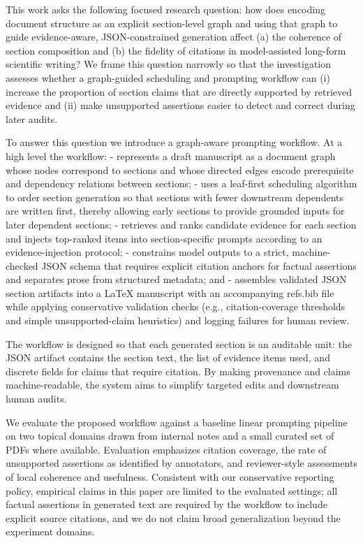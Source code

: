 \documentclass{article}%
\begin{document}
This work asks the following focused research question: how does encoding document structure as an explicit section-level graph and using that graph to guide evidence-aware, JSON-constrained generation affect (a) the coherence of section composition and (b) the fidelity of citations in model-assisted long-form scientific writing? We frame this question narrowly so that the investigation assesses whether a graph-guided scheduling and prompting workflow can (i) increase the proportion of section claims that are directly supported by retrieved evidence and (ii) make unsupported assertions easier to detect and correct during later audits.

To answer this question we introduce a graph-aware prompting workflow. At a high level the workflow: - represents a draft manuscript as a document graph whose nodes correspond to sections and whose directed edges encode prerequisite and dependency relations between sections; - uses a leaf-first scheduling algorithm to order section generation so that sections with fewer downstream dependents are written first, thereby allowing early sections to provide grounded inputs for later dependent sections; - retrieves and ranks candidate evidence for each section and injects top-ranked items into section-specific prompts according to an evidence-injection protocol; - constrains model outputs to a strict, machine-checked JSON schema that requires explicit citation anchors for factual assertions and separates prose from structured metadata; and - assembles validated JSON section artifacts into a LaTeX manuscript with an accompanying refs.bib file while applying conservative validation checks (e.g., citation-coverage thresholds and simple unsupported-claim heuristics) and logging failures for human review.

The workflow is designed so that each generated section is an auditable unit: the JSON artifact contains the section text, the list of evidence items used, and discrete fields for claims that require citation. By making provenance and claims machine-readable, the system aims to simplify targeted edits and downstream human audits.

We evaluate the proposed workflow against a baseline linear prompting pipeline on two topical domains drawn from internal notes and a small curated set of PDFs where available. Evaluation emphasizes citation coverage, the rate of unsupported assertions as identified by annotators, and reviewer-style assessments of local coherence and usefulness. Consistent with our conservative reporting policy, empirical claims in this paper are limited to the evaluated settings; all factual assertions in generated text are required by the workflow to include explicit source citations, and we do not claim broad generalization beyond the experiment domains.
\end{document}
